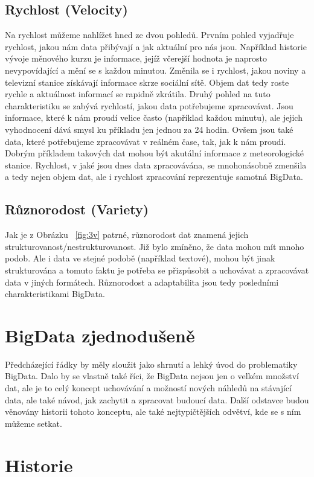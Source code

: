 \subsection{Rychlost (Velocity)}
Na rychlost můžeme nahlížet hned ze dvou pohledů. Prvním pohled vyjadřuje rychlost, jakou nám data přibývají a jak aktuální pro nás jsou. Například historie vývoje měnového kurzu je informace, jejíž včerejší hodnota je naprosto nevypovídající a mění se s každou minutou. Změnila se i rychlost, jakou noviny a televizní stanice získávají informace skrze sociální sítě. Objem dat tedy roste rychle a aktuálnost informací se rapidně zkrátila. Druhý pohled na tuto charakteristiku se zabývá rychlostí, jakou data potřebujeme zpracovávat. Jsou informace, které k nám proudí velice často (například každou minutu), ale jejich vyhodnocení dává smysl ku příkladu jen jednou za 24 hodin. Ovšem jsou také data, které potřebujeme zpracovávat v reálném čase, tak, jak k nám proudí. Dobrým příkladem takových dat mohou být akutální informace z meteorologické stanice. 
Rychlost, v jaké jsou dnes data zpracovávána, se mnohonásobně zmenšila a tedy nejen objem dat, ale i rychlost zpracování reprezentuje samotná BigData.

\subsection{Různorodost (Variety)}
Jak je z Obrázku ~\ref{fig:3v} patrné, různorodost dat znamená jejich strukturovanost/nestrukturovanost. Již bylo zmíněno, že data mohou mít mnoho podob. Ale i data ve stejné podobě (například textové), mohou být jinak strukturována a tomuto faktu je potřeba se přizpůsobit a uchovávat a zpracovávat data v jiných formátech. %
Různorodost a adaptabilita jsou tedy posledními charakteristikami BigData.

\section{BigData zjednodušeně}
Předcházející řádky by měly sloužit jako shrnutí a lehký úvod do problematiky BigData. Dalo by se vlastně také říci, že BigData nejsou jen o velkém množství dat, ale je to celý koncept uchovávání a možností nových náhledů na stávající data, ale také návod, jak zachytit a zpracovat budoucí data. Další odstavce budou věnovány historii tohoto konceptu, ale také nejtypičtějších odvětví, kde se s ním můžeme setkat. 

\section{Historie}

